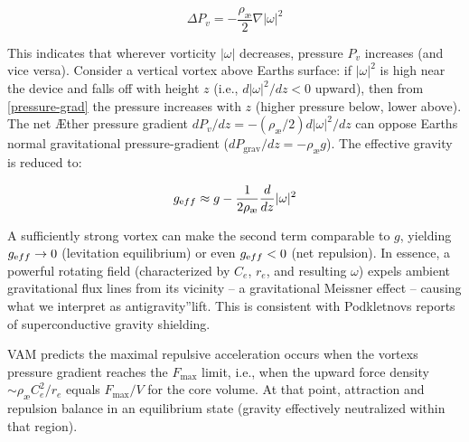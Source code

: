 \[
\Delta P_v = -\frac{\rho_\text{\ae}}{2} \nabla |\omega|^2
\]  \label{pressure-grad}

This indicates that wherever vorticity $|\omega|$ decreases, pressure $P_v$ increases (and vice versa). Consider a vertical vortex above Earth\rqs s surface: if $|\omega|^2$ is high near the device and falls off with height $z$ (i.e., $d|\omega|^2 / dz < 0$ upward), then from \eqref{pressure-grad} the pressure increases with $z$ (higher pressure below, lower above). The net Æther pressure gradient $dP_v / dz = -(\rho_\text{\ae} / 2) d|\omega|^2 / dz$ can oppose Earth\rqs s normal gravitational pressure-gradient ($dP_\text{grav} / dz = -\rho_\text{\ae} g$). The effective gravity is reduced to:

\[
g_{\textrm eff} \approx g - \frac{1}{2 \rho_\text{\ae}} \frac{d}{dz} |\omega|^2
\]  \label{g-eff}

A sufficiently strong vortex can make the second term comparable to $g$, yielding $g_{\textrm eff}\to0$ (levitation equilibrium) or even $g_{\textrm eff}<0$ (net repulsion). In essence, a powerful rotating field (characterized by $C_e$, $r_e$, and resulting $\omega$) expels ambient gravitational flux lines from its vicinity – a gravitational Meissner effect – causing what we interpret as \grqq antigravity\textquotedblright lift. This is consistent with Podkletnov\rqs s reports of superconductive gravity shielding.

VAM predicts the maximal repulsive acceleration occurs when the vortex\rqs s pressure gradient reaches the $F_{\max}$ limit, i.e., when the upward force density $\sim \rho_\text{\ae} C_e^2/r_e$ equals $F_{\max}/V$ for the core volume. At that point, attraction and repulsion balance in an equilibrium state (gravity effectively neutralized within that region).

